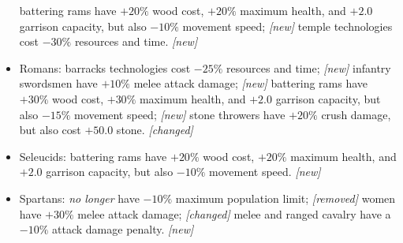 \documentclass{article}
\begin{document}
\begin{itemize}
  \subitem battering rams have $+20\%$ wood cost, $+20\%$ maximum health, and $+2.0$ garrison capacity, but also $-10\%$ movement speed; \emph{[new]}
  \subitem temple technologies cost $-30\%$ resources and time. \emph{[new]}
  \item Romans:
  \subitem barracks technologies cost $-25\%$ resources and time; \emph{[new]}
  \subitem infantry swordsmen have $+10\%$ melee attack damage; \emph{[new]}
  \subitem battering rams have $+30\%$ wood cost, $+30\%$ maximum health, and $+2.0$ garrison capacity, but also $-15\%$ movement speed; \emph{[new]}
  \subitem stone throwers have $+20\%$ crush damage, but also cost $+50.0$ stone. \emph{[changed]}
  \item Seleucids:
  \subitem battering rams have $+20\%$ wood cost, $+20\%$ maximum health, and $+2.0$ garrison capacity, but also $-10\%$ movement speed. \emph{[new]}
  \item Spartans:
  \subitem \emph{no longer} have $-10\%$ maximum population limit; \emph{[removed]}
  \subitem women have $+30\%$ melee attack damage; \emph{[changed]}
  \subitem melee and ranged cavalry have a $-10\%$ attack damage penalty. \emph{[new]}
\end{itemize}
\end{document}
